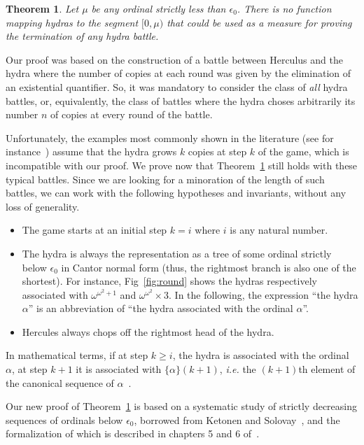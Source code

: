 \documentclass{easychair}
\newtheorem{theorem}{Theorem}
\newcommand{\canonseq}[2]{\mbox{$\{#1\}(#2)$}}
\begin{document}
\begin{theorem}
  Let $\mu$ be any ordinal strictly less than $\epsilon_0$.
  There is no function mapping hydras to the segment $[0,\mu)$ that could be used as a measure for  proving the termination of  \emph{any} hydra battle.\label{thm3}
\end{theorem}

Our proof was based on the construction of a battle between Herculus and the hydra where the
number of copies at each round was given by the elimination of an existential quantifier. So, it was mandatory to consider the class of \emph{all} hydra battles, or, equivalently, the class of battles where the hydra choses arbitrarily its number $n$ of copies at every round of the battle.

Unfortunately, the examples  most commonly shown in the literature
(see for instance~\cite{KP82, bauer2008, BauerHydra}) 
assume that the hydra grows $k$ copies at step $k$ of the game, which is incompatible with our proof.
We prove now that Theorem~\ref{thm3} still holds with these typical battles.
Since we are looking  for a minoration of the length of such battles,
we can work with the following hypotheses and invariants, 
without any loss of generality.
 
 \begin{itemize}
   \item The game starts at an initial step $k=i$ where $i$ is any natural number.
   \item  The hydra is always the  representation as a tree of some ordinal strictly below $\epsilon_0$ in Cantor normal
     form (thus, the rightmost branch is also one of the shortest).
     For instance, Fig~\ref{fig:round} shows the hydras respectively associated with  $\omega^{\omega^2+1}$ and $\omega^{\omega^2}\times 3$.
     In the following,  the expression  ``the hydra $\alpha$'' is an abbreviation of ``the hydra associated with the ordinal $\alpha$''.
 
 \item Hercules always chops off the rightmost head of the hydra.
 \end{itemize}
 
 In mathematical terms, if at step $k\geq i$, the hydra is associated with the ordinal $\alpha$, at step $k+1$ it is associated with
 $\canonseq{\alpha}{k+1}$, \emph{i.e.} the $(k+1)$th element of the canonical sequence of $\alpha$~\cite{KS81}.

 Our new proof of Theorem~\ref{thm3} is based on a systematic study of strictly decreasing sequences of ordinals below $\epsilon_0$, borrowed from Ketonen and Solovay~\cite{KS81}, and the formalization of which is described  in chapters 5 and 6 of~\cite{HydraBook}.
 
\end{document}
